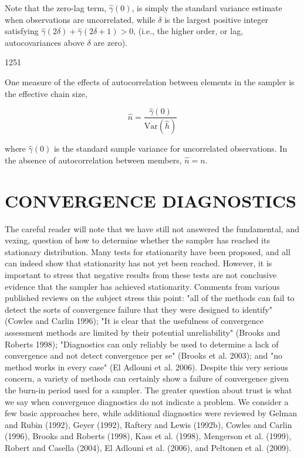 \documentclass{article}
\begin{document}
Note that the zero-lag term,  $ \widehat{\gamma}(0) $, is simply the standard variance estimate when observations are uncorrelated, while  $ \delta $ is the largest positive integer satisfying  $ \widehat{\gamma}(2\delta) + \widehat{\gamma}(2\delta + 1) > 0 $, (i.e., the higher order, or lag, autocovariances above  $ \delta $ are zero).

1251

One measure of the effects of autocorrelation between elements in the sampler is the effective chain size,

\begin{equation}
\widehat{n}=\frac{\widehat{\gamma}(0)}{\mathrm{Var}\left(\widehat{h}\right)}
\end{equation}

where  $ \widehat{\gamma}(0) $ is the standard sample variance for uncorrelated observations. In the absence of autocorrelation between members,  $ \widehat{n} = n $.

\section{CONVERGENCE DIAGNOSTICS}
The careful reader will note that we have still not answered the fundamental, and vexing, question of how to determine whether the sampler has reached its stationary distribution. Many tests for stationarity have been proposed, and all can indeed show that stationarity has not yet been reached. However, it is important to stress that negative results from these tests are not conclusive evidence that the sampler has achieved stationarity. Comments from various published reviews on the subject stress this point: "all of the methods can fail to detect the sorts of convergence failure that they were designed to identify" (Cowles and Carlin 1996); "It is clear that the usefulness of convergence assessment methods are limited by their potential unreliability" (Brooks and Roberts 1998); "Diagnostics can only reliably be used to determine a lack of convergence and not detect convergence per se" (Brooks et al. 2003); and "no method works in every case" (El Adlouni et al. 2006). Despite this very serious concern, a variety of methods can certainly show a failure of convergence given the burn-in period used for a sampler. The greater question about trust is what we say when convergence diagnostics do not indicate a problem. We consider a few basic approaches here, while additional diagnostics were reviewed by Gelman and Rubin (1992), Geyer (1992), Raftery and Lewis (1992b), Cowles and Carlin (1996), Brooks and Roberts (1998), Kass et al. (1998), Mengerson et al. (1999), Robert and Casella (2004), El Adlouni et al. (2006), and Peltonen et al. (2009).
\end{document}
